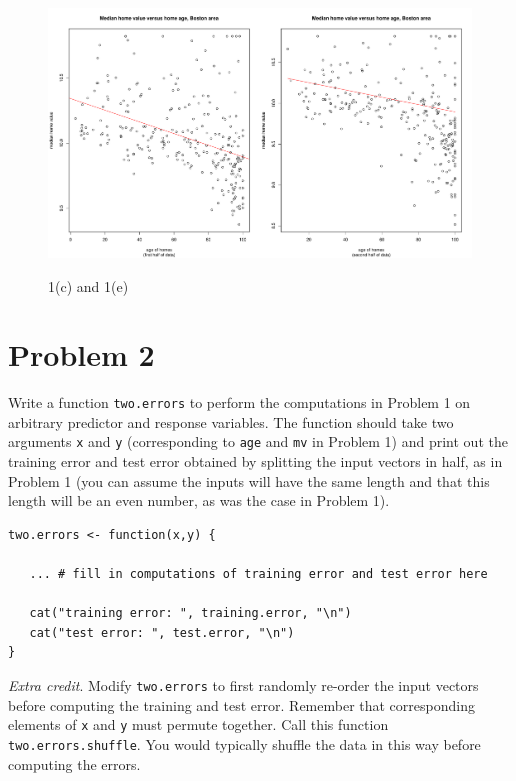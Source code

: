 \documentclass[11pt]{article}
\theoremstyle{plain}
\theoremstyle{definition}
\begin{document}
\begin{figure}[p]
	\includegraphics[scale=.4]{"hw3(c)(e)"}
	\label{}
	\caption{1(c) and 1(e)}
\end{figure}


\section*{Problem 2}

Write a function \texttt{two.errors} to perform the computations in
Problem 1 on arbitrary predictor and response variables. The function
should take two arguments \texttt{x} and \texttt{y} (corresponding to
\texttt{age} and \texttt{mv} in Problem 1) and print out the training
error and test error obtained by splitting the input vectors in half,
as in Problem 1 (you can assume the inputs will have the same length
and that this length will be an even number, as was the case in Problem 1).

\begin{verbatim}
two.errors <- function(x,y) {

   ... # fill in computations of training error and test error here

   cat("training error: ", training.error, "\n")
   cat("test error: ", test.error, "\n")
}
\end{verbatim}

\noindent\emph{Extra credit}. Modify \texttt{two.errors} to first randomly re-order the input vectors before computing the training and test error. Remember that corresponding elements of \texttt{x} and \texttt{y} must permute together. Call this function \texttt{two.errors.shuffle}. You would typically shuffle the data in this way before computing the errors.
\end{document}
